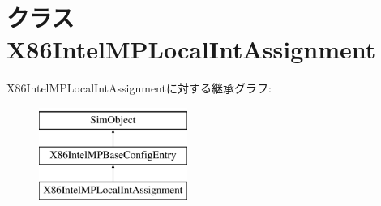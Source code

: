 \hypertarget{classIntelMP_1_1X86IntelMPLocalIntAssignment}{
\section{クラス X86IntelMPLocalIntAssignment}
\label{classIntelMP_1_1X86IntelMPLocalIntAssignment}
}
X86IntelMPLocalIntAssignmentに対する継承グラフ:\begin{figure}[H]
\begin{center}
\leavevmode
\includegraphics[height=3cm]{classIntelMP_1_1X86IntelMPLocalIntAssignment}
\end{center}
\end{figure}
